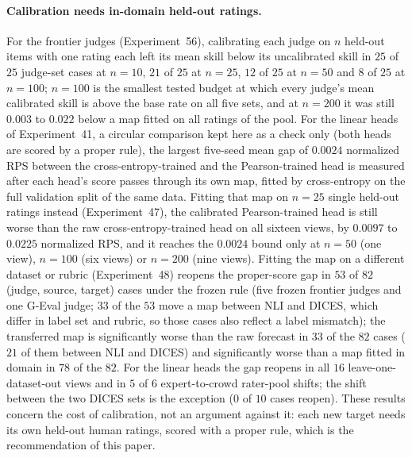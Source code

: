 \paragraph{Calibration needs in-domain held-out ratings.}
For the frontier judges (Experiment~56), calibrating each judge on $n$ held-out items with one rating each left its mean skill below its uncalibrated skill in $25$ of $25$ judge-set cases at $n=10$, $21$ of $25$ at $n=25$, $12$ of $25$ at $n=50$ and $8$ of $25$ at $n=100$; $n=100$ is the smallest tested budget at which every judge's mean calibrated skill is above the base rate on all five sets, and at $n=200$ it was still $0.003$ to $0.022$ below a map fitted on all ratings of the pool.
For the linear heads of Experiment~41, a circular comparison kept here as a check only (both heads are scored by a proper rule), the largest five-seed mean gap of $0.0024$ normalized RPS between the cross-entropy-trained and the Pearson-trained head is measured after each head's score passes through its own map, fitted by cross-entropy on the full validation split of the same data.
Fitting that map on $n=25$ single held-out ratings instead (Experiment~47), the calibrated Pearson-trained head is still worse than the raw cross-entropy-trained head on all sixteen views, by $0.0097$ to $0.0225$ normalized RPS, and it reaches the $0.0024$ bound only at $n=50$ (one view), $n=100$ (six views) or $n=200$ (nine views).
Fitting the map on a different dataset or rubric (Experiment~48) reopens the proper-score gap in $53$ of $82$ (judge, source, target) cases under the frozen rule (five frozen frontier judges and one G-Eval judge; $33$ of the $53$ move a map between NLI and DICES, which differ in label set and rubric, so those cases also reflect a label mismatch); the transferred map is significantly worse than the raw forecast in $33$ of the $82$ cases ($21$ of them between NLI and DICES) and significantly worse than a map fitted in domain in $78$ of the $82$.
For the linear heads the gap reopens in all $16$ leave-one-dataset-out views and in $5$ of $6$ expert-to-crowd rater-pool shifts; the shift between the two DICES sets is the exception ($0$ of $10$ cases reopen).
These results concern the cost of calibration, not an argument against it: each new target needs its own held-out human ratings, scored with a proper rule, which is the recommendation of this paper.


